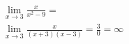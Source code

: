 \begin{ex}
\begin{align}
&\lim_{x\rightarrow 3} \frac{x}{x^2-9}=\nonumber\\
&\lim_{x\rightarrow 3} \frac{x}{(x+3)(x-3)}=\frac{3}{0}=\infty\nonumber
\end{align}
\end{ex}